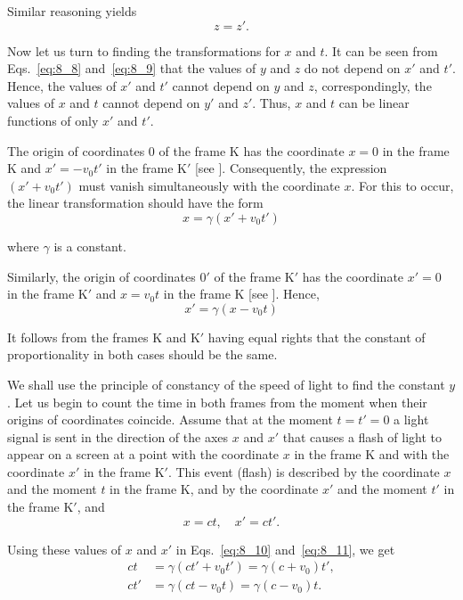 \noindent
Similar reasoning yields
\begin{equation}\label{eq:8_9}
	z = z'.
\end{equation}

Now let us turn to finding the transformations for $x$ and $t$. It can be seen from Eqs.~\eqref{eq:8_8} and~\eqref{eq:8_9} that the values of $y$ and $z$ do not depend on $x'$ and $t'$. Hence, the values of $x'$ and $t'$ cannot depend on $y$ and $z$, correspondingly, the values of $x$ and $t$ cannot depend on $y'$ and $z'$. Thus, $x$ and $t$ can be linear functions of only $x'$ and $t'$.

The origin of coordinates $0$ of the frame K has the coordinate $x=0$ in the frame K and $x'=-v_0t'$ in the frame K$'$ [see ]. Consequently, the expression $(x'+v_0t')$ must vanish simultaneously with the coordinate $x$. For this to occur, the linear transformation should have the form
\begin{equation}\label{eq:8_10}
	x = \gamma (x' + v_0 t')
\end{equation}

\noindent
where $\gamma$ is a constant.

Similarly, the origin of coordinates $0'$ of the frame K$'$ has the coordinate $x'=0$ in the frame K$'$ and $x=v_0t$ in the frame K [see ]. Hence,
\begin{equation}\label{eq:8_11}
	x' = \gamma (x - v_0 t)
\end{equation}

\noindent
It follows from the frames K and K$'$ having equal rights that the constant of proportionality in both cases should be the same.

We shall use the principle of constancy of the speed of light to find the constant $y$. Let us begin to count the time in both frames from the moment when their origins of coordinates coincide. Assume that at the moment $t=t'=0$ a light signal is sent in the direction of the axes $x$ and $x'$ that causes a flash of light to appear on a screen at a point with the coordinate $x$ in the frame K and with the coordinate $x'$ in the frame K$'$. This event (flash) is described by the coordinate $x$ and the moment $t$ in the frame K, and by the coordinate $x'$ and the moment $t'$ in the frame K$'$, and
\begin{equation*}
	x = ct,\quad x' = ct'.
\end{equation*}

\noindent
Using these values of $x$ and $x'$ in Eqs.~\eqref{eq:8_10} and~\eqref{eq:8_11}, we get
\begin{align*}
	ct  &= \gamma (ct' + v_0 t') = \gamma (c + v_0)t',\\
	ct' &= \gamma (ct - v_0 t) = \gamma (c - v_0)t.
\end{align*}

